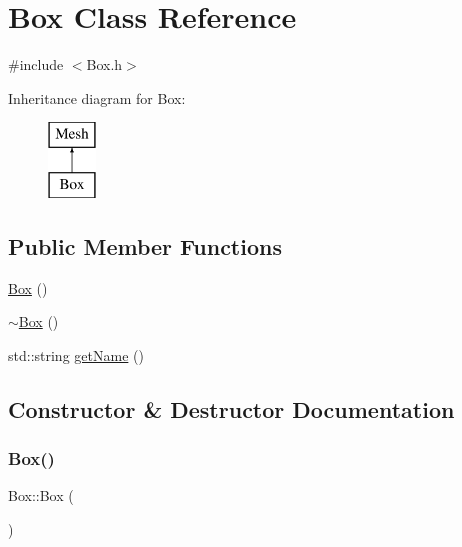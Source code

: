 \hypertarget{class_box}{}\section{Box Class Reference}
\label{class_box}


{\ttfamily \#include $<$Box.\+h$>$}

Inheritance diagram for Box\+:\begin{figure}[H]
\begin{center}
\leavevmode
\includegraphics[height=2.000000cm]{class_box}
\end{center}
\end{figure}
\subsection*{Public Member Functions}
\begin{DoxyCompactItemize}
\item 
\mbox{\hyperlink{class_box_aca78d7db44972bfa78d46b7bbc8796f6}{Box}} ()
\item 
\mbox{\hyperlink{class_box_a6a5e09398e85d602a046b429062fb9c2}{$\sim$\+Box}} ()
\item 
std\+::string \mbox{\hyperlink{class_box_ac8792393d053c6cac65a36e5c1f27f15}{get\+Name}} ()
\end{DoxyCompactItemize}


\subsection{Constructor \& Destructor Documentation}
\mbox{\label{class_box_aca78d7db44972bfa78d46b7bbc8796f6}} 
\subsubsection{\texorpdfstring{Box()}{Box()}}
{\footnotesize\ttfamily Box\+::\+Box (\begin{DoxyParamCaption}{ }\end{DoxyParamCaption})}

\mbox{\label{class_box_a6a5e09398e85d602a046b429062fb9c2}} 
